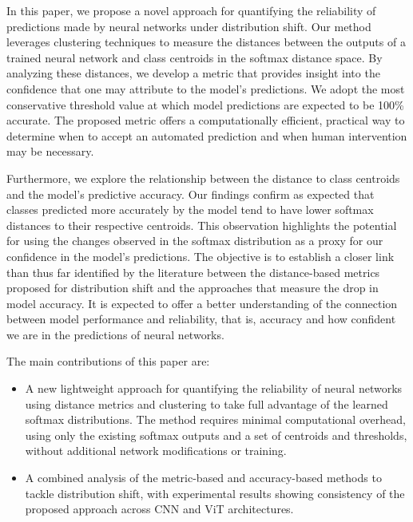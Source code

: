 In this paper, we propose a novel approach for quantifying the reliability of predictions made by neural networks under distribution shift. Our method leverages clustering techniques to measure the distances between the outputs of a trained neural network and class centroids in the softmax distance space. By analyzing these distances, we develop a metric that provides insight into the confidence that one may attribute to the model's predictions. We adopt the most conservative threshold value at which model predictions are expected to be 100\% accurate. The proposed metric offers a computationally efficient, practical way to determine when to accept an automated prediction and when human intervention may be necessary.

Furthermore, we explore the relationship between the distance to class centroids and the model's predictive accuracy. Our findings confirm as expected that classes predicted more accurately by the model tend to have lower softmax distances to their respective centroids. This observation highlights the potential for using the changes observed in the softmax distribution as a proxy for our confidence in the model's predictions. The objective is to establish a closer link than thus far identified by the literature between the distance-based metrics proposed for distribution shift and the approaches that measure the drop in model accuracy. It is expected to offer a better understanding of the connection between model performance and reliability, that is, accuracy and how confident we are in the predictions of neural networks. 



The main contributions of this paper are:
\begin{itemize}
\item A new lightweight approach for quantifying the reliability of neural networks using distance metrics and clustering to take full advantage of the learned softmax distributions. The method requires minimal computational overhead, using only the existing softmax outputs and a set of centroids and thresholds, without additional network modifications or training.
\item A combined analysis of the metric-based and accuracy-based methods to tackle distribution shift, with experimental results showing consistency of the proposed approach across CNN and ViT architectures.
\end{itemize}

